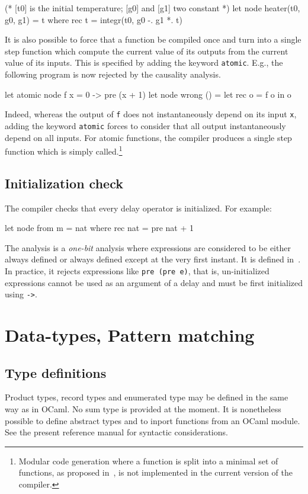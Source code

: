 \documentclass[11pt,titlepage,twoside]{report}
\newcommand{\ocaml}{{\sf OCaml}}
\begin{document}
\begin{runverbatim}[withresult,include=integr]
(* [t0] is the initial temperature; [g0] and [g1] two constant *)
let node heater(t0, g0, g1) = t where
  rec t = integr(t0, g0 -. g1 *. t)
\end{runverbatim}
It is also possible to force
that a function be compiled once and turn into a single step function
which compute the current value of its outputs from the current value of its
inputs. This is specified by
adding the keyword \texttt{atomic}. E.g., the following program is now rejected
by the causality analysis.
%
\begin{runverbatim}
let atomic node f x = 0 -> pre (x + 1)
let node wrong () =
  let rec o = f o in o
\end{runverbatim}
%
Indeed, whereas the output
of \texttt{f} does not instantaneously depend on its input \texttt{x},
adding the keyword \texttt{atomic} forces to consider that all output
instantaneously depend on all inputs. For atomic functions, the
compiler produces a single step function which is simply
called.\footnote{Modular code generation where a function is split
  into a minimal set of functions, as proposed
  in~\cite{lucy:emsoft09,lustre:tripakis-popl09}, is not implemented
  in the current version of the compiler.}

\subsection{Initialization check}
\label{initialisation-check}
The compiler checks that every delay operator is initialized. For
example:
\begin{runverbatim}
let node from m = nat where
  rec nat = pre nat + 1
\end{runverbatim}
The analysis is a {\em one-bit} analysis where expressions are
considered to be either always defined or always defined except at the
very first instant.  It is defined in~\cite{lucy:sttt04}. In
practice, it rejects expressions like \verb-pre (pre e)-, that is,
un-initialized expressions cannot be used as an argument of a delay
and must be first initialized using \verb+->+.


\section{Data-types, Pattern matching}

\subsection{Type definitions}
Product types, record types and enumerated type may be defined in the same
way as in \ocaml. No sum type is provided at the moment. It is nonetheless
possible to define abstract types and to inport functions from an \ocaml{} module.
See the present reference manual for syntactic considerations.
\end{document}
